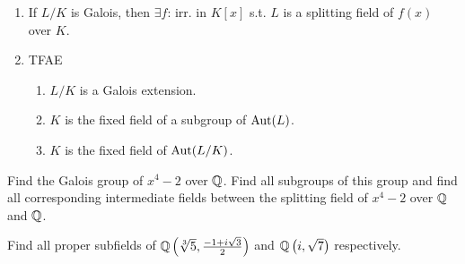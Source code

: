 \begin{exercise} \mbox{}
  \begin{enumerate}
    \item If $L/K$ is Galois, then $\exists f$: irr. in $K[x]$ s.t.
      $L$ is a splitting field of $f(x)$ over $K$.
    \item TFAE
      \begin{enumerate}
        \item $L/K$ is a Galois extension.
        \item $K$ is the fixed field of a subgroup of $\operatorname{Aut}(L)$.
        \item $K$ is the fixed field of $\operatorname{Aut}(L/K)$.
      \end{enumerate}
  \end{enumerate}
\end{exercise}

\begin{exercise}
  Find the Galois group of $x^4 - 2$ over $\mathbb{Q}$. Find all subgroups of this
  group and find all corresponding intermediate fields between the splitting
  field of $x^4 - 2$ over $\mathbb{Q}$ and $\mathbb{Q}$.
\end{exercise}

\begin{exercise}
  Find all proper subfields of
  $\mathbb{Q}\left(\sqrt[3]{5}, \frac{-1 + i\sqrt{3}}{2}\right)$ and
  $\mathbb{Q}\left(i, \sqrt{7}\right)$ respectively.
\end{exercise}
